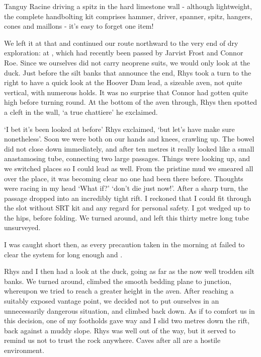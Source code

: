 \begin{marginfigure}
\checkoddpage \ifoddpage \forcerectofloat \else \forceversofloat \fi
\centering
 \caption{Tanguy Racine driving a spitz in the hard limestone wall - although lightweight, the complete handbolting kit comprises hammer, driver, spanner, spitz, hangers, cones and maillons - it's easy to forget one item! }
 \label{tanguy bolting}
\end{marginfigure}


We left it at that and continued our route northward to the very end of dry exploration: at , which had recently been passed by Jarvist Frost and Connor Roe. Since we ourselves did not carry neoprene suits, we would only look at the duck. Just before the silt banks that announce the end, Rhys took a turn to the right to have a quick look at the Hoover Dam lead, a sizeable aven, not quite vertical, with numerous holds. It was no surprise that Connor had gotten quite high before turning round. At the bottom of the aven through, Rhys then spotted a cleft in the wall, `a true chattiere' he exclaimed.

`I bet it's been looked at before' Rhys exclaimed, `but let's have make sure nonetheless'. Soon we were both on our hands and knees, crawling up. The bowel did not close down immediately, and after ten metres it really looked like a small anastamosing tube, connecting two large passages. Things were looking up, and we switched places so I could lead as well. From the pristine mud we smeared all over the place, it was becoming clear no one had been there before. Thoughts were racing in my head `What if?' `don't die just now!'. After a sharp turn, the passage dropped into an incredibly tight rift. I reckoned that I could fit through the slot without SRT kit and any regard for personal safety. I got wedged up to the hips, before folding. We turned around, and left this thirty metre long tube unsurveyed. 

I was caught short then, as every precaution taken in the morning at  failed to clear the system for long enough and . 

Rhys and I then had a look at the duck, going as far as the now well trodden silt banks. We turned around, climbed the smooth bedding plane to  junction, whereupon we tried to reach a greater height in the aven. After reaching a suitably exposed vantage point, we decided not to put ourselves in an unnecessarily dangerous situation, and climbed back down. As if to comfort us in this decision, one of my footholds gave way and I slid two metres down the rift, back against a muddy slope. Rhys was well out of the way, but it served to remind us not to trust the rock anywhere. Caves after all are a hostile environment. 

